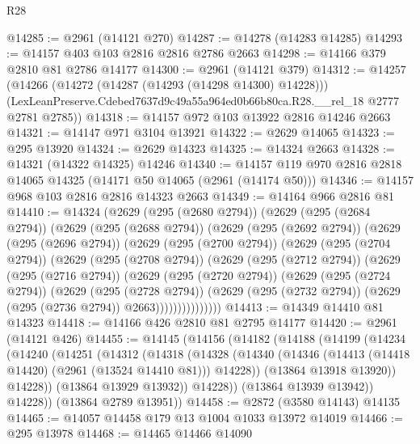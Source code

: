 \begin{lexlean}{R28}
\begin{coremodule}
@14285 := @2961 (@14121 @270)
@14287 := @14278 (@14283 @14285)
@14293 := @14157 @403 @103 @2816 @2816 @2786 @2663
@14298 := @14166 @379 @2810 @81 @2786 @14177
@14300 := @2961 (@14121 @379)
@14312 := @14257
    (@14266
      (@14272 (@14287 (@14293 (@14298 @14300) @14228)))
      (LexLeanPreserve.Cdebed7637d9c49a55a964ed0b66b80ca.R28.__rel_18 @2777 @2781 @2785))
@14318 := @14157 @972 @103 @13922 @2816 @14246 @2663
@14321 := @14147 @971 @3104 @13921
@14322 := @2629 @14065
@14323 := @295 @13920
@14324 := @2629 @14323
@14325 := @14324 @2663
@14328 := @14321 (@14322 @14325) @14246
@14340 := @14157 @119 @970 @2816 @2818 @14065 @14325 (@14171 @50 @14065 (@2961 (@14174 @50)))
@14346 := @14157 @968 @103 @2816 @2816 @14323 @2663
@14349 := @14164 @966 @2816 @81
@14410 := @14324
    (@2629
      (@295 (@2680 @2794))
      (@2629
        (@295 (@2684 @2794))
        (@2629
          (@295 (@2688 @2794))
          (@2629
            (@295 (@2692 @2794))
            (@2629
              (@295 (@2696 @2794))
              (@2629
                (@295 (@2700 @2794))
                (@2629
                  (@295 (@2704 @2794))
                  (@2629
                    (@295 (@2708 @2794))
                    (@2629
                      (@295 (@2712 @2794))
                      (@2629
                        (@295 (@2716 @2794))
                        (@2629
                          (@295 (@2720 @2794))
                          (@2629
                            (@295 (@2724 @2794))
                            (@2629
                              (@295 (@2728 @2794))
                              (@2629
                                (@295 (@2732 @2794))
                                (@2629 (@295 (@2736 @2794)) @2663)))))))))))))))
@14413 := @14349 @14410 @81 @14323
@14418 := @14166 @426 @2810 @81 @2795 @14177
@14420 := @2961 (@14121 @426)
@14455 := @14145
    (@14156
      (@14182
        (@14188
          (@14199
            (@14234
              (@14240
                (@14251
                  (@14312
                    (@14318
                      (@14328
                        (@14340
                          (@14346 (@14413 (@14418 @14420) (@2961 (@13524 @14410 @81))) @14228))
                        (@13864 @13918 @13920))
                      @14228))
                  (@13864 @13929 @13932))
                @14228))
            (@13864 @13939 @13942))
          @14228))
      (@13864 @2789 @13951))
@14458 := @2872 (@3580 @14143) @14135
@14465 := @14057 @14458 @179 @13 @1004 @1033 @13972 @14019
@14466 := @295 @13978
@14468 := @14465 @14466 @14090

\end{coremodule}
\end{lexlean}
